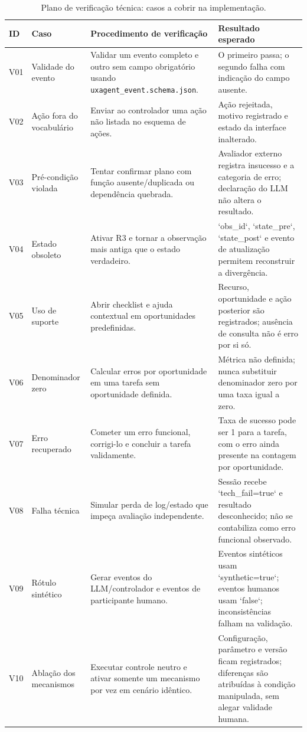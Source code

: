 \documentclass[conference]{IEEEtran}
\begin{document}
\begin{table}[!t]
\centering
\caption{Plano de verificação técnica: casos a cobrir na implementação.}
\label{tab:testes}
\scriptsize
\renewcommand{\arraystretch}{1.08}
\begin{tabularx}{\textwidth}{@{}p{1.0cm}p{3.0cm}Y Y@{}}
\toprule
\textbf{ID} & \textbf{Caso} & \textbf{Procedimento de verificação} & \textbf{Resultado esperado} \\
\midrule
V01 & Validade do evento & Validar um evento completo e outro sem campo obrigatório usando \texttt{uxagent\_event.schema.json}. & O primeiro passa; o segundo falha com indicação do campo ausente. \\
V02 & Ação fora do vocabulário & Enviar ao controlador uma ação não listada no esquema de ações. & Ação rejeitada, motivo registrado e estado da interface inalterado. \\
V03 & Pré-condição violada & Tentar confirmar plano com função ausente/duplicada ou dependência quebrada. & Avaliador externo registra insucesso e a categoria de erro; declaração do LLM não altera o resultado. \\
V04 & Estado obsoleto & Ativar R3 e tornar a observação mais antiga que o estado verdadeiro. & `obs\_id`, `state\_pre`, `state\_post` e evento de atualização permitem reconstruir a divergência. \\
V05 & Uso de suporte & Abrir checklist e ajuda contextual em oportunidades predefinidas. & Recurso, oportunidade e ação posterior são registrados; ausência de consulta não é erro por si só. \\
V06 & Denominador zero & Calcular erros por oportunidade em uma tarefa sem oportunidade definida. & Métrica não definida; nunca substituir denominador zero por uma taxa igual a zero. \\
V07 & Erro recuperado & Cometer um erro funcional, corrigi-lo e concluir a tarefa validamente. & Taxa de sucesso pode ser 1 para a tarefa, com o erro ainda presente na contagem por oportunidade. \\
V08 & Falha técnica & Simular perda de log/estado que impeça avaliação independente. & Sessão recebe `tech\_fail=true` e resultado desconhecido; não se contabiliza como erro funcional observado. \\
V09 & Rótulo sintético & Gerar eventos do LLM/controlador e eventos de participante humano. & Eventos sintéticos usam `synthetic=true`; eventos humanos usam `false`; inconsistências falham na validação. \\
V10 & Ablação dos mecanismos & Executar controle neutro e ativar somente um mecanismo por vez em cenário idêntico. & Configuração, parâmetro e versão ficam registrados; diferenças são atribuídas à condição manipulada, sem alegar validade humana. \\
\bottomrule
\end{tabularx}
\end{table}
\end{document}
